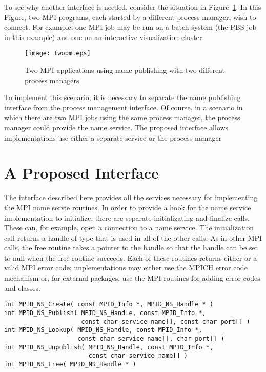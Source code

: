 \documentclass{article}
\begin{document}
To see why another interface is needed, consider the situation in
Figure~\ref{fig:multiple-pm}.  In this Figure, two MPI programs, each
started by a different process manager, wish to connect.  For example,
one MPI job may be run on a batch system (the PBS job in this example)
and one on an interactive visualization cluster.

\begin{figure}
\centerline{\texttt{[image: twopm.eps]}}
\caption{Two MPI applications using name publishing with two different
process managers}\label{fig:multiple-pm}
\end{figure}

To implement this scenario, it is necessary to separate the name
publishing interface from the process management interface.  
Of course, in a scenario in which there are two MPI jobs using the
same process manager, the process manager could provide the name
service.  The proposed interface allows implementations use either a
separate service or the process manager

\section{A Proposed Interface}
\label{sec:name-interface}

The interface described here provides all the services necessary for
implementing the MPI name servie routines.  In order to provide a hook
for the name service implementation to initialize, there are separate
initializating and finalize calls.  These can, for example, open a
connection to a name service.  The initialization call returns a
handle of type  that is used in all of the other
calls.  As in other MPI calls, the free routine takes a pointer to the
handle so that the handle can be set to null when the free routine
succeeds.  Each of these routines returns either  or
a valid MPI error code; implementations may either use the MPICH
error code mechanism or, for external packages, use the MPI routines
for adding error codes and classes.

\begin{verbatim}
int MPID_NS_Create( const MPID_Info *, MPID_NS_Handle * )
int MPID_NS_Publish( MPID_NS_Handle, const MPID_Info *, 
                     const char service_name[], const char port[] )
int MPID_NS_Lookup( MPID_NS_Handle, const MPID_Info *,
                    const char service_name[], char port[] )
int MPID_NS_Unpublish( MPID_NS_Handle, const MPID_Info *, 
                       const char service_name[] )
int MPID_NS_Free( MPID_NS_Handle * )
\end{verbatim}
\end{document}
